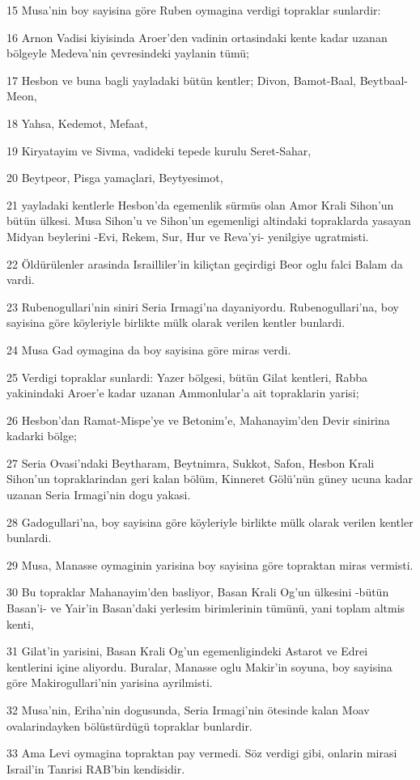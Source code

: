 \par 15 Musa'nin boy sayisina göre Ruben oymagina verdigi topraklar sunlardir:
\par 16 Arnon Vadisi kiyisinda Aroer'den vadinin ortasindaki kente kadar uzanan bölgeyle Medeva'nin çevresindeki yaylanin tümü;
\par 17 Hesbon ve buna bagli yayladaki bütün kentler; Divon, Bamot-Baal, Beytbaal-Meon,
\par 18 Yahsa, Kedemot, Mefaat,
\par 19 Kiryatayim ve Sivma, vadideki tepede kurulu Seret-Sahar,
\par 20 Beytpeor, Pisga yamaçlari, Beytyesimot,
\par 21 yayladaki kentlerle Hesbon'da egemenlik sürmüs olan Amor Krali Sihon'un bütün ülkesi. Musa Sihon'u ve Sihon'un egemenligi altindaki topraklarda yasayan Midyan beylerini -Evi, Rekem, Sur, Hur ve Reva'yi- yenilgiye ugratmisti.
\par 22 Öldürülenler arasinda Israilliler'in kiliçtan geçirdigi Beor oglu falci Balam da vardi.
\par 23 Rubenogullari'nin siniri Seria Irmagi'na dayaniyordu. Rubenogullari'na, boy sayisina göre köyleriyle birlikte mülk olarak verilen kentler bunlardi.
\par 24 Musa Gad oymagina da boy sayisina göre miras verdi.
\par 25 Verdigi topraklar sunlardi: Yazer bölgesi, bütün Gilat kentleri, Rabba yakinindaki Aroer'e kadar uzanan Ammonlular'a ait topraklarin yarisi;
\par 26 Hesbon'dan Ramat-Mispe'ye ve Betonim'e, Mahanayim'den Devir sinirina kadarki bölge;
\par 27 Seria Ovasi'ndaki Beytharam, Beytnimra, Sukkot, Safon, Hesbon Krali Sihon'un topraklarindan geri kalan bölüm, Kinneret Gölü'nün güney ucuna kadar uzanan Seria Irmagi'nin dogu yakasi.
\par 28 Gadogullari'na, boy sayisina göre köyleriyle birlikte mülk olarak verilen kentler bunlardi.
\par 29 Musa, Manasse oymaginin yarisina boy sayisina göre topraktan miras vermisti.
\par 30 Bu topraklar Mahanayim'den basliyor, Basan Krali Og'un ülkesini -bütün Basan'i- ve Yair'in Basan'daki yerlesim birimlerinin tümünü, yani toplam altmis kenti,
\par 31 Gilat'in yarisini, Basan Krali Og'un egemenligindeki Astarot ve Edrei kentlerini içine aliyordu. Buralar, Manasse oglu Makir'in soyuna, boy sayisina göre Makirogullari'nin yarisina ayrilmisti.
\par 32 Musa'nin, Eriha'nin dogusunda, Seria Irmagi'nin ötesinde kalan Moav ovalarindayken bölüstürdügü topraklar bunlardir.
\par 33 Ama Levi oymagina topraktan pay vermedi. Söz verdigi gibi, onlarin mirasi Israil'in Tanrisi RAB'bin kendisidir.

